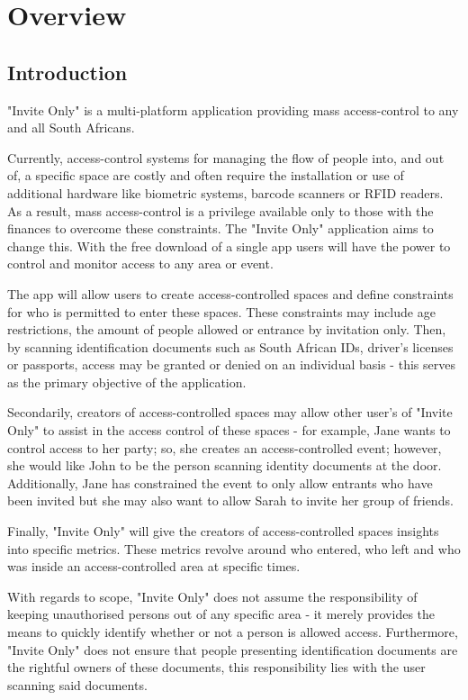 \section{Overview}

\subsection{Introduction}

"Invite Only" is a multi-platform application providing mass access-control to any and all South Africans.

Currently, access-control systems for managing the flow of people into, and out of, a specific space are costly and often require the installation or use of additional hardware like biometric systems, barcode scanners or RFID readers. As a result, mass access-control is a privilege available only to those with the finances to overcome these constraints. The "Invite Only" application aims to change this. With the free download of a single app users will have the power to control and monitor access to any area or event.

The app will allow users to create access-controlled spaces and define constraints for who is permitted to enter these spaces. These constraints may include age restrictions, the amount of people allowed or entrance by invitation only. Then, by scanning identification documents such as South African IDs, driver's licenses or passports, access may be granted or denied on an individual basis - this serves as the primary objective of the application.

Secondarily, creators of access-controlled spaces may allow other user's of "Invite Only" to assist in the access control of these spaces - for example, Jane wants to control access to her party; so, she creates an access-controlled event; however, she would like John to be the person scanning identity documents at the door. Additionally, Jane has constrained the event to only allow entrants who have been invited but she may also want to allow Sarah to invite her group of friends.

Finally, "Invite Only" will give the creators of access-controlled spaces insights into specific metrics. These metrics revolve around who entered, who left and who was inside an access-controlled area at specific times.

With regards to scope, "Invite Only" does not assume the responsibility of keeping unauthorised persons out of any specific area - it merely provides the means to quickly identify whether or not a person is allowed access. Furthermore, "Invite Only" does not ensure that people presenting identification documents are the rightful owners of these documents, this responsibility lies with the user scanning said documents.

